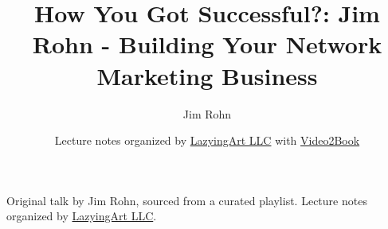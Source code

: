 \documentclass[11pt,oneside]{book}
\begin{document}
\frontmatter
\title{How You Got Successful?: Jim Rohn - Building Your Network Marketing Business}
\author{Jim Rohn}
\date{Lecture notes organized by \href{https://lazying.art}{LazyingArt LLC} with \href{https://github.com/lachlanchen/Video2Book}{Video2Book}}
\maketitle
\begin{center}
\small Original talk by Jim Rohn, sourced from a curated playlist. Lecture notes organized by \href{https://lazying.art}{LazyingArt LLC}.
\end{center}
\clearpage
\mainmatter

\end{document}
